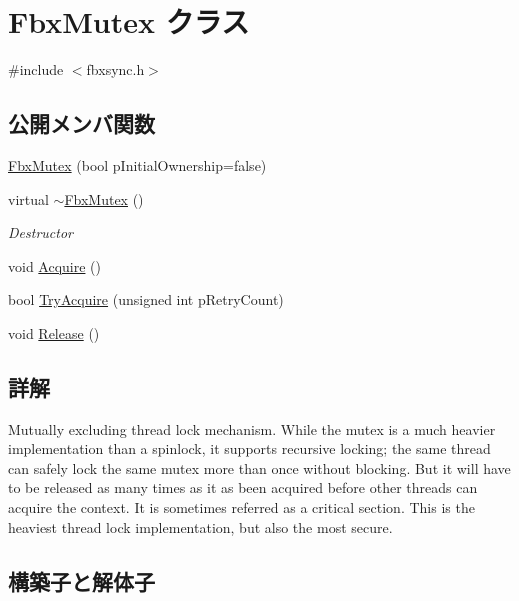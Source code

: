 \hypertarget{class_fbx_mutex}{}\section{Fbx\+Mutex クラス}
\label{class_fbx_mutex}


{\ttfamily \#include $<$fbxsync.\+h$>$}

\subsection*{公開メンバ関数}
\begin{DoxyCompactItemize}
\item 
\hyperlink{class_fbx_mutex_af2e9cbb51bc45952ccb6a310717e70a1}{Fbx\+Mutex} (bool p\+Initial\+Ownership=false)
\item 
virtual \hyperlink{class_fbx_mutex_a68eda93d02e2adc9f717d28208305aa6}{$\sim$\+Fbx\+Mutex} ()
\begin{DoxyCompactList}\small\item\em Destructor \end{DoxyCompactList}\item 
void \hyperlink{class_fbx_mutex_abca054ea52a16ade66050af56a04b97c}{Acquire} ()
\item 
bool \hyperlink{class_fbx_mutex_ace271bd592e917dffdc850b74482d52f}{Try\+Acquire} (unsigned int p\+Retry\+Count)
\item 
void \hyperlink{class_fbx_mutex_af64f050aba0c86a19c75c8fc236325d1}{Release} ()
\end{DoxyCompactItemize}


\subsection{詳解}
Mutually excluding thread lock mechanism. While the mutex is a much heavier implementation than a spinlock, it supports recursive locking; the same thread can safely lock the same mutex more than once without blocking. But it will have to be released as many times as it as been acquired before other threads can acquire the context. It is sometimes referred as a critical section. This is the heaviest thread lock implementation, but also the most secure. 

\subsection{構築子と解体子}
\mbox{\label{class_fbx_mutex_af2e9cbb51bc45952ccb6a310717e70a1}} 
